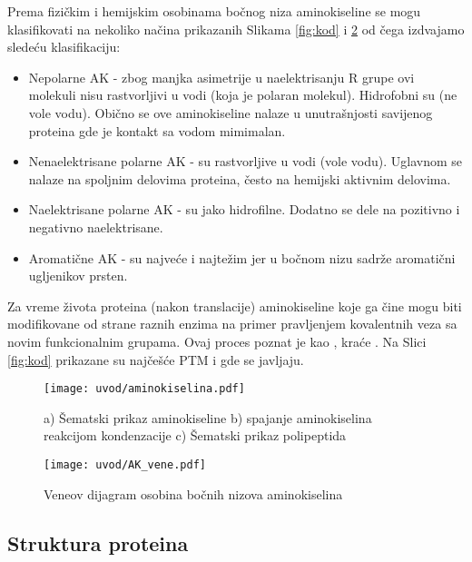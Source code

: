 Prema fizičkim i hemijskim osobinama bočnog niza aminokiseline se mogu
klasifikovati na nekoliko načina prikazanih Slikama \ref{fig:kod} i
\ref{fig:AK_vene} od čega izdvajamo sledeću klasifikaciju:
\begin{itemize}
  \item Nepolarne AK -
    zbog manjka asimetrije u naelektrisanju R grupe ovi molekuli nisu
    rastvorljivi u vodi (koja je polaran molekul). Hidrofobni su (ne vole
    vodu).  Obično se ove aminokiseline nalaze u unutrašnjosti savijenog proteina gde
    je kontakt sa vodom mimimalan.
    
  \item Nenaelektrisane polarne AK -
    su rastvorljive u vodi (vole vodu). Uglavnom se nalaze na spoljnim
    delovima proteina, često na hemijski aktivnim delovima.

  \item Naelektrisane polarne AK -
    su jako hidrofilne. Dodatno se dele na pozitivno i negativno naelektrisane.

  \item Aromatične AK - su najveće i najtežim jer u bočnom nizu sadrže
    aromatični ugljenikov prsten.
\end{itemize}

Za vreme života proteina (nakon translacije) aminokiseline koje ga čine mogu
biti modifikovane od strane raznih enzima na primer pravljenjem kovalentnih
veza sa novim funkcionalnim grupama.  Ovaj proces poznat je kao
, kraće .  Na Slici
\ref{fig:kod} prikazane su najčešće PTM i gde se javljaju.

\begin{figure}[th]
\centering
\texttt{[image: uvod/aminokiselina.pdf]}
\caption {a) Šematski prikaz aminokiseline
b) spajanje aminokiselina reakcijom kondenzacije
c) Šematski prikaz polipeptida
}
\label{fig:AK}
\end{figure}


\begin{figure}[th]
\centering
\texttt{[image: uvod/AK\_vene.pdf]}
\caption {Veneov dijagram osobina bočnih nizova aminokiselina}
\label{fig:AK_vene}
\end{figure}

\clearpage


\subsection{Struktura proteina}

